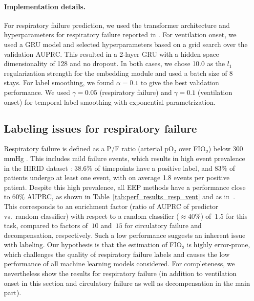 \documentclass[nohyperref]{article}
\begin{document}
 \paragraph{Implementation details.} For respiratory failure prediction, we used the transformer architecture and hyperparameters for {respiratory failure} reported in \citet{yeche2021}. For ventilation onset, we used a GRU model and selected hyperparameters based on a grid search over the validation AUPRC. This resulted in a 2-layer GRU with a hidden space dimensionality of 128 and no dropout. In both cases, we chose 10.0 as the $l_1$ regularization strength for the embedding module and used a batch size of 8 stays. For label smoothing, we found $\alpha = 0.1$ to give the best validation performance. We used $\gamma=0.05$ (respiratory failure) and $\gamma=0.1$ (ventilation onset) for temporal label smoothing with exponential parametrization.
 
\subsection{Labeling issues for respiratory failure}
\label{sec:label-issues}

Respiratory failure is defined as a P/F ratio (arterial pO$_2$ over FIO$_2$) below $300$ mmHg \citep{yeche2021}. This includes mild failure events, which results in high event prevalence in the HIRID dataset \citep{hyland2020}: 38.6\% of timepoints have a positive label, and 83\% of patients undergo at least one event, with on average 1.8 events per positive patient. Despite this high prevalence, all EEP methods have a performance close to $60\%$ AUPRC, as shown in Table~\ref{tab:perf_results_resp_vent} and as in~\citet{yeche2021}. This corresponds to an enrichment factor (ratio of AUPRC of predictor vs.\ random classifier) with respect to a random classifier ($\approx 40\%$) of $~1.5$ for this task, compared to factors of $~10$ and $~15$ for circulatory failure and decompensation, respectively. Such a low performance suggests an inherent issue with labeling. Our hypothesis is that the estimation of FIO$_2$ is highly error-prone, which challenges the quality of respiratory failure labels and causes the low performance of all machine learning models considered. For completeness, we nevertheless show the results for respiratory failure (in addition to ventilation onset in this section and circulatory failure as well as decompensation in the main part).
\end{document}
